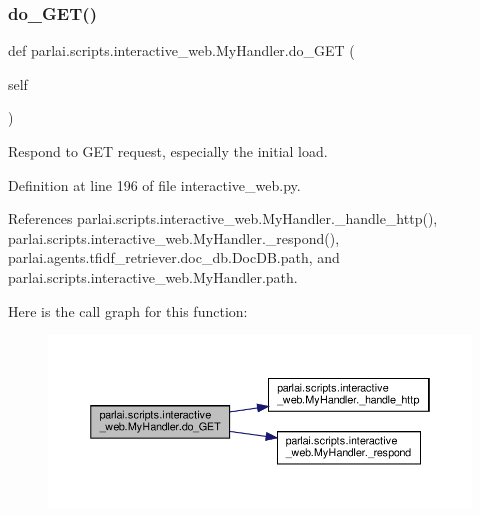 \subsubsection{\texorpdfstring{do\+\_\+\+G\+E\+T()}{do\_GET()}}
{\footnotesize\ttfamily def parlai.\+scripts.\+interactive\+\_\+web.\+My\+Handler.\+do\+\_\+\+G\+ET (\begin{DoxyParamCaption}\item[{}]{self }\end{DoxyParamCaption})}

\begin{DoxyVerb}Respond to GET request, especially the initial load.\end{DoxyVerb}
 

Definition at line 196 of file interactive\+\_\+web.\+py.



References parlai.\+scripts.\+interactive\+\_\+web.\+My\+Handler.\+\_\+handle\+\_\+http(), parlai.\+scripts.\+interactive\+\_\+web.\+My\+Handler.\+\_\+respond(), parlai.\+agents.\+tfidf\+\_\+retriever.\+doc\+\_\+db.\+Doc\+D\+B.\+path, and parlai.\+scripts.\+interactive\+\_\+web.\+My\+Handler.\+path.

Here is the call graph for this function\+:
\nopagebreak
\begin{figure}[H]
\begin{center}
\leavevmode
\includegraphics[width=350pt]{classparlai_1_1scripts_1_1interactive__web_1_1MyHandler_aacb5ca9cbf2a9f2278d3b093e463ec00_cgraph}
\end{center}
\end{figure}
\mbox{\label{classparlai_1_1scripts_1_1interactive__web_1_1MyHandler_a2231328696ebba922f2e5e1d9b8ebb56}} 
